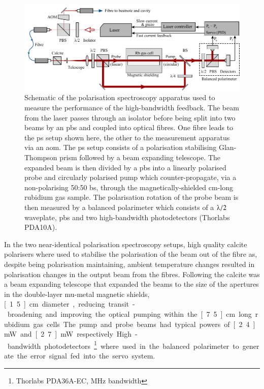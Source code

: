 \begin{figure}
\center
\includegraphics[width=\linewidth]{part1/Figs/ps_two_laser.pdf}
\caption[Apparatus used to test the efficacy of polarisation spectroscopy.]{Schematic of the polarisation spectroscopy apparatus used to measure the performance of the high-bandwidth feedback. The beam from the laser passes through an isolator before being split into two beams by an \gls{pbs} and coupled into optical fibres.
One fibre leads to the \gls{ps} setup shown here, the other to the measurement apparatus via an \gls{aom}.
The \gls{ps} setup consists of a polarisation stabilising Glan-Thompson prism followed by a beam expanding telescope.
The expanded beam is then divided by a \gls{pbs} into a linearly polarised probe and circularly polarised pump which counter-propagate, via a non-polarising 50:50 \gls{bs}, through the magnetically-shielded \unit[15]{cm}-long rubidium gas sample.
The polarisation rotation of the probe beam is then measured by a balanced polarimeter which consists of a $\lambdaup/2$ waveplate, \gls{pbs} and two high-bandwidth photodetectors (Thorlabs PDA10A).}
\label{figure:two_laser_setup}
\end{figure}

In the two near-identical polarisation spectroscopy setups, high quality calcite polarisers where used to stabilise the polarisation of the beam out of the fibre as, despite being polarisation maintaining, ambient temperature changes resulted in polarisation changes in the output beam from the fibres.
Following the calcite was a beam expanding telescope that expanded the beams to the size of the apertures in the double-layer mu-metal magnetic shields, \unit[1.5]{cm} diameter, reducing transit-broadening and improving the optical pumping within the \unit[7.5]{cm} long rubidium gas cells.
The pump and probe beams had typical powers of \unit[2.4]{mW} and \unit[2.7]{mW} respectively.
High-bandwidth photodetectors\footnote{Thorlabs PDA36A-EC, \unit[150]{MHz} bandwidth} where used in the balanced polarimeter to generate the error signal fed into the servo system.

